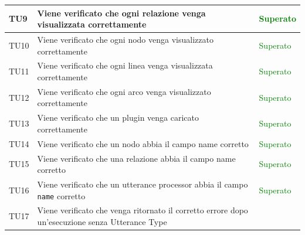 \documentclass[openany,12pt,a4paper]{report}
\begin{document}
\begin{longtable}[c]{| p{2.5cm} |p{8cm} | p{2.5cm} |}
	\\[1em]
	\hline
	\newline TU9&
	\newline Viene verificato che ogni relazione venga visualizzata correttamente&
	\newline \textcolor{green}{Superato}
	\\[1em]
	\hline
	\newline TU10&
	\newline Viene verificato che ogni nodo venga visualizzato correttamente&
	\newline \textcolor{green}{Superato}
	\\[1em]
	\hline
	\newline TU11&
	\newline Viene verificato che ogni linea venga visualizzata correttamente&
	\newline \textcolor{green}{Superato}
	\\[1em]
	\hline
	\newline TU12&
	\newline Viene verificato che ogni arco venga visualizzato correttamente&
	\newline \textcolor{green}{Superato}
	\\[1em]
	\hline
	\newline TU13&
	\newline Viene verificato che un plugin venga caricato correttamente&
	\newline \textcolor{green}{Superato}
	\\[1em]
	\hline
	\newline TU14&
	\newline Viene verificato che un nodo abbia il campo name corretto&
	\newline \textcolor{green}{Superato}
	\\[1em]
	\hline
	\newline TU15&
	\newline Viene verificato che una relazione abbia il campo name corretto&
	\newline \textcolor{green}{Superato}
	\\[1em]
	\hline
	\newline TU16&
	\newline Viene verificato che un utterance processor abbia il campo \verb|name| corretto&
	\newline \textcolor{green}{Superato}
	\\[1em]
	\hline
	\newline TU17&
	\newline Viene verificato che venga ritornato il corretto errore dopo un'esecuzione senza Utterance Type&

\end{longtable}
\end{document}
